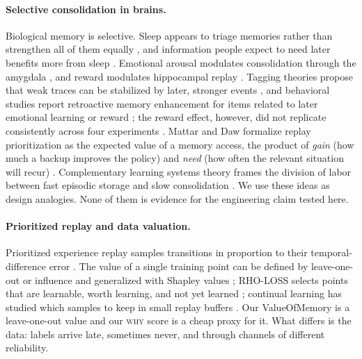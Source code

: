 \documentclass[11pt]{article}
\newcommand{\WHY}{\textsc{why}}
\newcommand{\eqname}[1]{\textsf{#1}}
\begin{document}
\paragraph{Selective consolidation in brains.} Biological memory is selective. Sleep appears to triage memories rather than strengthen all of them equally \citep{stickgold2013}, and information people expect to need later benefits more from sleep \citep{wilhelm2011}. Emotional arousal modulates consolidation through the amygdala \citep{mcgaugh2004}, and reward modulates hippocampal replay \citep{singer2009,ambrose2016}. Tagging theories propose that weak traces can be stabilized by later, stronger events \citep{frey1997,moncada2007}, and behavioral studies report retroactive memory enhancement for items related to later emotional learning \citep{dunsmoor2015} or reward \citep{patil2017}; the reward effect, however, did not replicate consistently across four experiments \citep{sukumaran2023}. Mattar and Daw formalize replay prioritization as the expected value of a memory access, the product of \emph{gain} (how much a backup improves the policy) and \emph{need} (how often the relevant situation will recur) \citep{mattar2018}. Complementary learning systems theory frames the division of labor between fast episodic storage and slow consolidation \citep{mcclelland1995,kumaran2016}. We use these ideas as design analogies. None of them is evidence for the engineering claim tested here.

\paragraph{Prioritized replay and data valuation.} Prioritized experience replay samples transitions in proportion to their temporal-difference error \citep{schaul2016per}. The value of a single training point can be defined by leave-one-out or influence \citep{koh2017} and generalized with Shapley values \citep{ghorbani2019}; RHO-LOSS selects points that are learnable, worth learning, and not yet learned \citep{mindermann2022}; continual learning has studied which samples to keep in small replay buffers \citep{aljundi2019,chaudhry2019}. Our \eqname{ValueOfMemory} is a leave-one-out value and our \WHY{} score is a cheap proxy for it. What differs is the data: labels arrive late, sometimes never, and through channels of different reliability.
\end{document}
